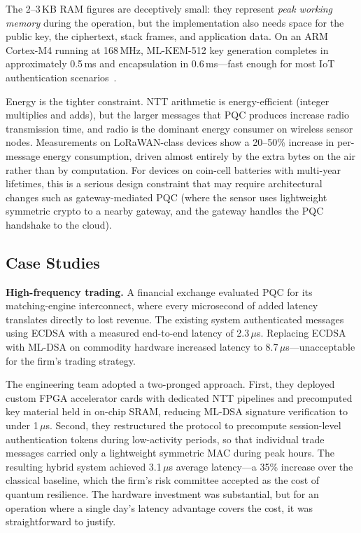 The 2--3\,KB RAM figures are deceptively small: they represent \emph{peak working memory} during the operation, but the implementation also needs space for the public key, the ciphertext, stack frames, and application data.  On an ARM Cortex-M4 running at 168\,MHz, ML-KEM-512 key generation completes in approximately 0.5\,ms and encapsulation in 0.6\,ms---fast enough for most IoT authentication scenarios~\cite{FIPS203}.

Energy is the tighter constraint.  NTT arithmetic is energy-efficient (integer multiplies and adds), but the larger messages that PQC produces increase radio transmission time, and radio is the dominant energy consumer on wireless sensor nodes.  Measurements on LoRaWAN-class devices show a 20--50\% increase in per-message energy consumption, driven almost entirely by the extra bytes on the air rather than by computation.  For devices on coin-cell batteries with multi-year lifetimes, this is a serious design constraint that may require architectural changes such as gateway-mediated PQC (where the sensor uses lightweight symmetric crypto to a nearby gateway, and the gateway handles the PQC handshake to the cloud).

\subsection{Case Studies}
\label{subsec:perf-case-studies}

\textbf{High-frequency trading.}\quad{}
A financial exchange evaluated PQC for its matching-engine interconnect, where every microsecond of added latency translates directly to lost revenue.  The existing system authenticated messages using ECDSA with a measured end-to-end latency of 2.3\,$\mu$s.  Replacing ECDSA with ML-DSA on commodity hardware increased latency to 8.7\,$\mu$s---unacceptable for the firm's trading strategy.

The engineering team adopted a two-pronged approach.  First, they deployed custom FPGA accelerator cards with dedicated NTT pipelines and precomputed key material held in on-chip SRAM, reducing ML-DSA signature verification to under 1\,$\mu$s.  Second, they restructured the protocol to precompute session-level authentication tokens during low-activity periods, so that individual trade messages carried only a lightweight symmetric MAC during peak hours.  The resulting hybrid system achieved 3.1\,$\mu$s average latency---a 35\% increase over the classical baseline, which the firm's risk committee accepted as the cost of quantum resilience.  The hardware investment was substantial, but for an operation where a single day's latency advantage covers the cost, it was straightforward to justify.

